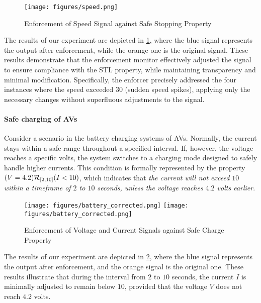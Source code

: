     \begin{figure}[h]
        \centering
        \texttt{[image: figures/speed.png]}
        \caption{Enforcement of Speed Signal against Safe Stopping Property}
        \label{fig:speed}
    \end{figure}

    The results of our experiment are depicted in \cref{fig:speed}, where the blue signal represents the output after enforcement, while the orange one is the original signal. These results demonstrate that the enforcement monitor effectively adjusted the signal to ensure compliance with the STL property, while maintaining transparency and minimal modification. Specifically, the enforcer precisely addressed the four instances where the speed exceeded $30$ (sudden speed spikes), applying only the necessary changes without superfluous adjustments to the signal.
  
    \paragraph{Safe charging of AVs}
    Consider a scenario in the battery charging systems of AVs. Normally, the current stays within a safe range throughout a specified interval. If, however, the voltage reaches a specific volts, the system switches to a charging mode designed to safely handle higher currents. This condition is formally represented by the property \((V=4.2) \release_{[2,10]} (I<10)\), which indicates that \textit{the current will not exceed $10$ within a timeframe of $2$ to $10$ seconds, unless the voltage reaches $4.2$ volts earlier}.

    \begin{figure}[t]
        \centering
        \texttt{[image: figures/battery\_corrected.png]}
        \texttt{[image: figures/battery\_corrected.png]}
        \caption{Enforcement of Voltage and Current Signals against Safe Charge Property}
        \label{fig:battery}
    \end{figure}

    The results of our experiment are depicted in \cref{fig:battery}, where the blue signal represents the output after enforcement, and the orange signal is the original one. These results illustrate that during the interval from $2$ to $10$ seconds, the current $I$ is minimally adjusted to remain below $10$, provided that the voltage $V$ does not reach $4.2$ volts.


